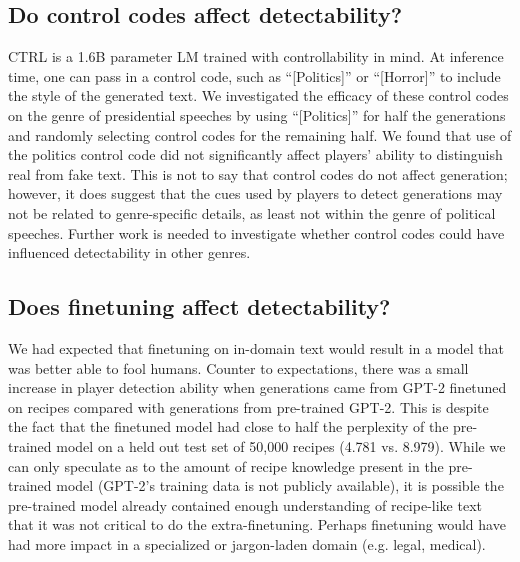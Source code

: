 \subsection{Do control codes affect detectability?}
CTRL is a 1.6B parameter LM trained with controllability in mind.
At inference time, one can pass in a control code, such as ``[Politics]'' or ``[Horror]'' to include the style of the generated text.
We investigated the efficacy of these control codes on the genre of presidential speeches by using ``[Politics]'' for half the generations and randomly selecting control codes for the remaining half.
We found that use of the politics control code did not significantly affect  players' ability to distinguish real from fake text.
This is not to say that control codes do not affect generation; however, it does suggest that the cues used by players to detect generations may not be related to genre-specific details, as least not within the genre of political speeches.
Further work is needed to investigate whether control codes could have influenced detectability in other genres.

\subsection{Does finetuning affect detectability?}
We had expected that finetuning on in-domain text would result in a model that was better able to fool humans.
Counter to expectations, there was a small increase in player detection ability when generations came from GPT-2 finetuned on recipes compared with generations from pre-trained GPT-2. This is despite the fact that the finetuned model had close to half the perplexity of the pre-trained model on a held out test set of 50,000 recipes (4.781 vs. 8.979).
While we can only speculate as to the amount of recipe knowledge present in the pre-trained model (GPT-2's training data is not publicly available), it is possible the pre-trained model already contained enough understanding of recipe-like text that it was not critical to do the extra-finetuning.
Perhaps finetuning would have had more impact in a specialized or jargon-laden domain (e.g. legal, medical).



